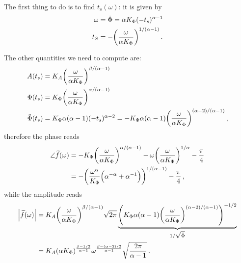 \documentclass[main.tex]{subfiles}
\begin{document}
The first thing to do is to find \(t_s(\omega )\): it is given by 
%
\begin{subequations}
\begin{align}
\omega &= \dot{\Phi} = \alpha K_\Phi (-t_s)^{\alpha -1}   \\
t_S &= - \qty( \frac{\omega }{\alpha  K_\Phi })^{1/(\alpha -1)}
\,.
\end{align}
\end{subequations}

The other quantities we need to compute are: 
%
\begin{subequations}
\begin{align}
A(t_s) &= K_A \qty(\frac{\omega  }{\alpha  K_\Phi })^{\beta / (\alpha-1 )}  \\
\Phi(t_s) &= K_\Phi \qty(\frac{\omega }{\alpha  K_\Phi })^{\alpha / (\alpha-1 )}  \\ 
\ddot{\Phi}(t_s) &= K_\Phi \alpha (\alpha -1) (-t_s)^{\alpha - 2} 
= - K_\Phi \alpha (\alpha -1) \qty(\frac{\omega }{\alpha  K_\Phi })^{(\alpha -2) / ( \alpha -1)}  
\,,
\end{align}
\end{subequations}
%
therefore the phase reads 
%
\begin{subequations}
\begin{align}
\angle \widetilde{f}(\omega ) &= - K_\Phi \qty(\frac{\omega }{\alpha  K_\Phi })^{\alpha / (\alpha-1 )} 
- \omega \qty(\frac{\omega }{\alpha  K_\Phi })^{1/\alpha } - \frac{\pi}{4}  \\
&= - \qty(\frac{\omega^{\alpha }}{K_\Phi } \qty(\alpha^{-\alpha } + \alpha^{-1}))^{1 / (\alpha - 1)}  - \frac{\pi}{4}
\,,
\end{align}
\end{subequations}
%
while the amplitude reads 
%
\begin{subequations}
\begin{align}
\abs{\widetilde{f}(\omega )} &= K_A \qty(\frac{\omega }{\alpha K_\Phi })^{\beta / (\alpha-1 )} \sqrt{2 \pi } \underbrace{\qty(K_\Phi \alpha (\alpha -1) \qty(\frac{\omega }{\alpha  K_\Phi })^{(\alpha -2) / ( \alpha -1)})^{-1/2}}_{1 / \sqrt{\ddot{\Phi}}}   \\
&= K_A 
(\alpha K_\Phi)^{\frac{\beta - 1/2}{\alpha -1}}
\omega^{\frac{\beta - (\alpha - 2) / 2}{\alpha -1}}
\sqrt{ \frac{2\pi}{\alpha -1} }
\,.
\end{align}
\end{subequations}
\end{document}
